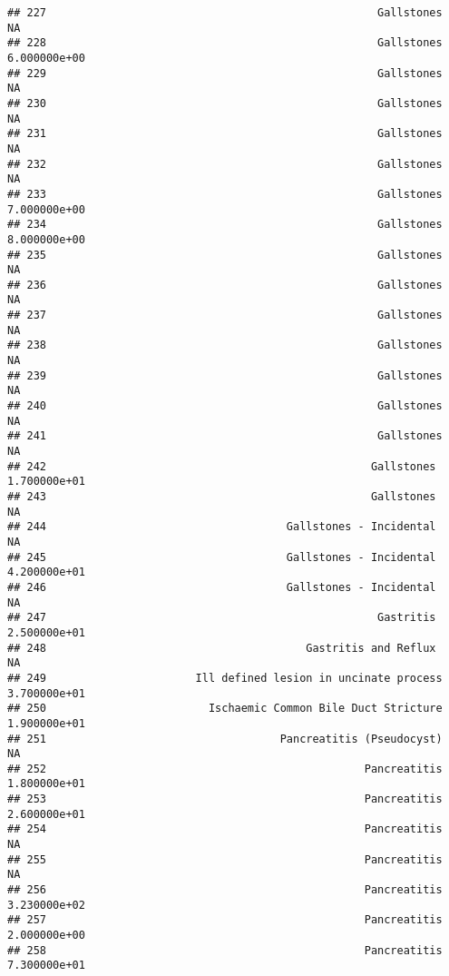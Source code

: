\documentclass[
]{article}
\begin{document}
\begin{verbatim}
## 227                                                   Gallstones            NA
## 228                                                   Gallstones  6.000000e+00
## 229                                                   Gallstones            NA
## 230                                                   Gallstones            NA
## 231                                                   Gallstones            NA
## 232                                                   Gallstones            NA
## 233                                                   Gallstones  7.000000e+00
## 234                                                   Gallstones  8.000000e+00
## 235                                                   Gallstones            NA
## 236                                                   Gallstones            NA
## 237                                                   Gallstones            NA
## 238                                                   Gallstones            NA
## 239                                                   Gallstones            NA
## 240                                                   Gallstones            NA
## 241                                                   Gallstones            NA
## 242                                                  Gallstones   1.700000e+01
## 243                                                  Gallstones             NA
## 244                                     Gallstones - Incidental             NA
## 245                                     Gallstones - Incidental   4.200000e+01
## 246                                     Gallstones - Incidental             NA
## 247                                                   Gastritis   2.500000e+01
## 248                                        Gastritis and Reflux             NA
## 249                       Ill defined lesion in uncinate process  3.700000e+01
## 250                         Ischaemic Common Bile Duct Stricture  1.900000e+01
## 251                                    Pancreatitis (Pseudocyst)            NA
## 252                                                 Pancreatitis  1.800000e+01
## 253                                                 Pancreatitis  2.600000e+01
## 254                                                 Pancreatitis            NA
## 255                                                 Pancreatitis            NA
## 256                                                 Pancreatitis  3.230000e+02
## 257                                                 Pancreatitis  2.000000e+00
## 258                                                 Pancreatitis  7.300000e+01

\end{verbatim}
\end{document}
